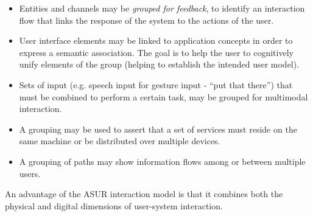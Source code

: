 \begin{itemize}
\item Entities and channels may be \emph{grouped for feedback}, to identify an interaction flow that links the response of the system to the actions of the user.

\item User interface elements may be linked to application concepts in order to express a semantic association. The goal is to help the user to cognitively unify elements of the group (helping to establish the intended user model).

\item Sets of input (e.g. speech input for gesture input - ``put that there'') that must be combined to perform a certain task, may be grouped for multimodal interaction.

\item A grouping may be used to assert that a set of services must reside on the same machine or be distributed over multiple devices.

\item A grouping of paths may show information flows among or between multiple users.

\end{itemize}

An advantage of the \ac{ASUR} interaction model is that it combines both the physical and digital dimensions of user-system interaction.

